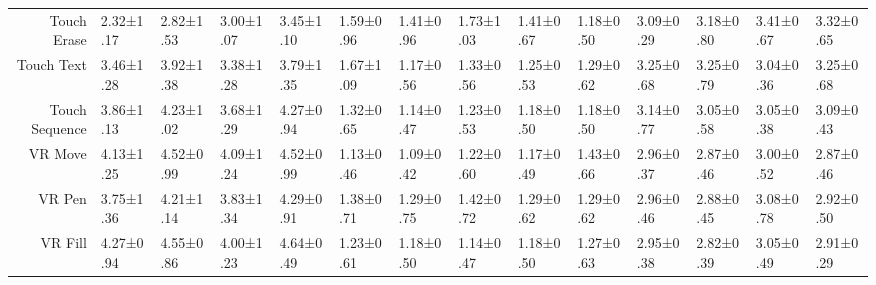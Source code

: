 \begin{table*}[b]
\begin{adjustbox}{width=\textwidth}
\begin{tabular}{rlllllllllllll}
Touch Erase & 2.32±1.17\cellcolor{lightblue!67} & 2.82±1.53\cellcolor{lightblue!54} & 3.00±1.07\cellcolor{lightblue!50} & 3.45±1.10\cellcolor{lightblue!38} & 1.59±0.96\cellcolor{lightblue!14} & 1.41±0.96\cellcolor{lightblue!10} & 1.73±1.03\cellcolor{lightblue!18} & 1.41±0.67\cellcolor{lightblue!10} & 1.18±0.50\cellcolor{lightblue!4} & 3.09±0.29\cellcolor{lightblue!4} & 3.18±0.80\cellcolor{lightblue!9} & 3.41±0.67\cellcolor{lightblue!20} & 3.32±0.65\cellcolor{lightblue!15} \\
Touch Text & 3.46±1.28\cellcolor{lightblue!38} & 3.92±1.38\cellcolor{lightblue!27} & 3.38±1.28\cellcolor{lightblue!40} & 3.79±1.35\cellcolor{lightblue!30} & 1.67±1.09\cellcolor{lightblue!16} & 1.17±0.56\cellcolor{lightblue!4} & 1.33±0.56\cellcolor{lightblue!8} & 1.25±0.53\cellcolor{lightblue!6} & 1.29±0.62\cellcolor{lightblue!7} & 3.25±0.68\cellcolor{lightblue!12} & 3.25±0.79\cellcolor{lightblue!12} & 3.04±0.36\cellcolor{lightblue!2} & 3.25±0.68\cellcolor{lightblue!12} \\
Touch Sequence & 3.86±1.13\cellcolor{lightblue!28} & 4.23±1.02\cellcolor{lightblue!19} & 3.68±1.29\cellcolor{lightblue!32} & 4.27±0.94\cellcolor{lightblue!18} & 1.32±0.65\cellcolor{lightblue!7} & 1.14±0.47\cellcolor{lightblue!3} & 1.23±0.53\cellcolor{lightblue!5} & 1.18±0.50\cellcolor{lightblue!4} & 1.18±0.50\cellcolor{lightblue!4} & 3.14±0.77\cellcolor{lightblue!6} & 3.05±0.58\cellcolor{lightblue!2} & 3.05±0.38\cellcolor{lightblue!2} & 3.09±0.43\cellcolor{lightblue!4} \\
\midrule
VR Move & 4.13±1.25\cellcolor{lightblue!21} & 4.52±0.99\cellcolor{lightblue!11} & 4.09±1.24\cellcolor{lightblue!22} & 4.52±0.99\cellcolor{lightblue!11} & 1.13±0.46\cellcolor{lightblue!3} & 1.09±0.42\cellcolor{lightblue!2} & 1.22±0.60\cellcolor{lightblue!5} & 1.17±0.49\cellcolor{lightblue!4} & 1.43±0.66\cellcolor{lightblue!10} & 2.96±0.37\cellcolor{lightblue!2} & 2.87±0.46\cellcolor{lightblue!6} & 3.00±0.52\cellcolor{lightblue!0} & 2.87±0.46\cellcolor{lightblue!6} \\
VR Pen & 3.75±1.36\cellcolor{lightblue!31} & 4.21±1.14\cellcolor{lightblue!19} & 3.83±1.34\cellcolor{lightblue!29} & 4.29±0.91\cellcolor{lightblue!17} & 1.38±0.71\cellcolor{lightblue!9} & 1.29±0.75\cellcolor{lightblue!7} & 1.42±0.72\cellcolor{lightblue!10} & 1.29±0.62\cellcolor{lightblue!7} & 1.29±0.62\cellcolor{lightblue!7} & 2.96±0.46\cellcolor{lightblue!2} & 2.88±0.45\cellcolor{lightblue!6} & 3.08±0.78\cellcolor{lightblue!4} & 2.92±0.50\cellcolor{lightblue!4} \\
VR Fill & 4.27±0.94\cellcolor{lightblue!18} & 4.55±0.86\cellcolor{lightblue!11} & 4.00±1.23\cellcolor{lightblue!25} & 4.64±0.49\cellcolor{lightblue!9} & 1.23±0.61\cellcolor{lightblue!5} & 1.18±0.50\cellcolor{lightblue!4} & 1.14±0.47\cellcolor{lightblue!3} & 1.18±0.50\cellcolor{lightblue!4} & 1.27±0.63\cellcolor{lightblue!6} & 2.95±0.38\cellcolor{lightblue!2} & 2.82±0.39\cellcolor{lightblue!9} & 3.05±0.49\cellcolor{lightblue!2} & 2.91±0.29\cellcolor{lightblue!4} \\

\end{tabular}
\end{adjustbox}
\end{table*}
